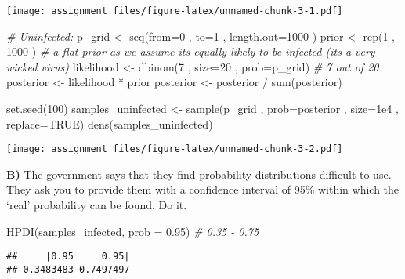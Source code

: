 \documentclass[
]{article}
\newenvironment{Shaded}{\begin{snugshade}}{\end{snugshade}}
\newcommand{\AttributeTok}[1]{\textcolor[rgb]{0.77,0.63,0.00}{#1}}
\newcommand{\CommentTok}[1]{\textcolor[rgb]{0.56,0.35,0.01}{\textit{#1}}}
\newcommand{\ConstantTok}[1]{\textcolor[rgb]{0.00,0.00,0.00}{#1}}
\newcommand{\DecValTok}[1]{\textcolor[rgb]{0.00,0.00,0.81}{#1}}
\newcommand{\FloatTok}[1]{\textcolor[rgb]{0.00,0.00,0.81}{#1}}
\newcommand{\FunctionTok}[1]{\textcolor[rgb]{0.00,0.00,0.00}{#1}}
\newcommand{\NormalTok}[1]{#1}
\newcommand{\OtherTok}[1]{\textcolor[rgb]{0.56,0.35,0.01}{#1}}
\newcommand{\SpecialCharTok}[1]{\textcolor[rgb]{0.00,0.00,0.00}{#1}}
\begin{document}
\texttt{[image: assignment\_files/figure-latex/unnamed-chunk-3-1.pdf]}

\begin{Shaded}
\begin{Highlighting}[]
\CommentTok{\# Uninfected: }
\NormalTok{p\_grid }\OtherTok{\textless{}{-}} \FunctionTok{seq}\NormalTok{(}\AttributeTok{from=}\DecValTok{0}\NormalTok{ , }\AttributeTok{to=}\DecValTok{1}\NormalTok{ , }\AttributeTok{length.out=}\DecValTok{1000}\NormalTok{ )}
\NormalTok{prior }\OtherTok{\textless{}{-}} \FunctionTok{rep}\NormalTok{(}\DecValTok{1}\NormalTok{ , }\DecValTok{1000}\NormalTok{ ) }\CommentTok{\# a flat prior as we assume it\textquotesingle{}s equally likely to be infected (it\textquotesingle{}s a very wicked virus)}
\NormalTok{likelihood }\OtherTok{\textless{}{-}} \FunctionTok{dbinom}\NormalTok{(}\DecValTok{7}\NormalTok{ , }\AttributeTok{size=}\DecValTok{20}\NormalTok{ , }\AttributeTok{prob=}\NormalTok{p\_grid) }\CommentTok{\# 7 out of 20}
\NormalTok{posterior }\OtherTok{\textless{}{-}}\NormalTok{ likelihood }\SpecialCharTok{*}\NormalTok{ prior}
\NormalTok{posterior }\OtherTok{\textless{}{-}}\NormalTok{ posterior }\SpecialCharTok{/} \FunctionTok{sum}\NormalTok{(posterior)}

\FunctionTok{set.seed}\NormalTok{(}\DecValTok{100}\NormalTok{)}
\NormalTok{samples\_uninfected }\OtherTok{\textless{}{-}} \FunctionTok{sample}\NormalTok{(p\_grid , }\AttributeTok{prob=}\NormalTok{posterior , }\AttributeTok{size=}\FloatTok{1e4}\NormalTok{ , }\AttributeTok{replace=}\ConstantTok{TRUE}\NormalTok{)}
\FunctionTok{dens}\NormalTok{(samples\_uninfected)}
\end{Highlighting}
\end{Shaded}

\texttt{[image: assignment\_files/figure-latex/unnamed-chunk-3-2.pdf]}

\textbf{B)} The government says that they find probability distributions
difficult to use. They ask you to provide them with a confidence
interval of 95\% within which the `real' probability can be found. Do
it.

\begin{Shaded}
\begin{Highlighting}[]
\FunctionTok{HPDI}\NormalTok{(samples\_infected, }\AttributeTok{prob =} \FloatTok{0.95}\NormalTok{) }\CommentTok{\# 0.35 {-} 0.75}
\end{Highlighting}
\end{Shaded}

\begin{verbatim}
##     |0.95     0.95| 
## 0.3483483 0.7497497
\end{verbatim}
\end{document}
